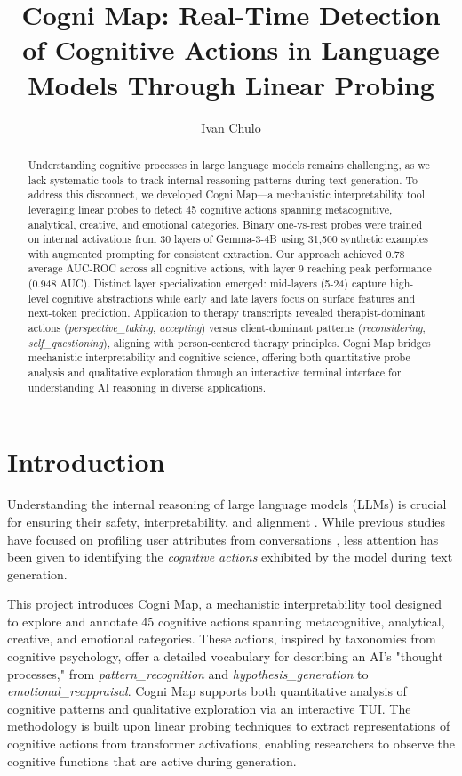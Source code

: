 \documentclass[letterpaper]{article}
\title{Cogni Map: Real-Time Detection of Cognitive Actions in Language Models Through Linear Probing}
\author{
    Ivan Chulo
}
\begin{document}
\maketitle

\begin{abstract}
Understanding cognitive processes in large language models remains challenging, as we lack systematic tools to track internal reasoning patterns during text generation. To address this disconnect, we developed Cogni Map—a mechanistic interpretability tool leveraging linear probes to detect 45 cognitive actions spanning metacognitive, analytical, creative, and emotional categories. Binary one-vs-rest probes were trained on internal activations from 30 layers of Gemma-3-4B using 31,500 synthetic examples with augmented prompting for consistent extraction. Our approach achieved 0.78 average AUC-ROC across all cognitive actions, with layer 9 reaching peak performance (0.948 AUC). Distinct layer specialization emerged: mid-layers (5-24) capture high-level cognitive abstractions while early and late layers focus on surface features and next-token prediction. Application to therapy transcripts revealed therapist-dominant actions (\textit{perspective\_taking}, \textit{accepting}) versus client-dominant patterns (\textit{reconsidering}, \textit{self\_questioning}), aligning with person-centered therapy principles. Cogni Map bridges mechanistic interpretability and cognitive science, offering both quantitative probe analysis and qualitative exploration through an interactive terminal interface for understanding AI reasoning in diverse applications.
\end{abstract}

\section{Introduction}

Understanding the internal reasoning of large language models (LLMs) is crucial for ensuring their safety, interpretability, and alignment \cite{bereska2024mechanistic}. While previous studies have focused on profiling user attributes from conversations \cite{chen2024designing}, less attention has been given to identifying the \textit{cognitive actions} exhibited by the model during text generation.

This project introduces Cogni Map, a mechanistic interpretability tool designed to explore and annotate 45 cognitive actions spanning metacognitive, analytical, creative, and emotional categories. These actions, inspired by taxonomies from cognitive psychology, offer a detailed vocabulary for describing an AI's "thought processes," from \textit{pattern\_recognition} and \textit{hypothesis\_generation} to \textit{emotional\_reappraisal}. Cogni Map supports both quantitative analysis of cognitive patterns and qualitative exploration via an interactive TUI. The methodology is built upon linear probing techniques \cite{alain2016understanding} to extract representations of cognitive actions from transformer activations, enabling researchers to observe the cognitive functions that are active during generation.
\end{document}

